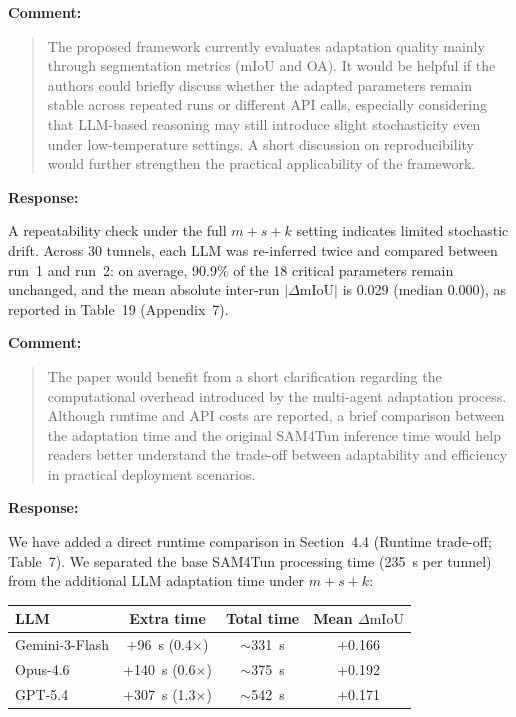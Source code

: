 \documentclass[11pt,a4paper]{article}
\newcommand{\MSRuntimeTable}{Table~7}
\newcommand{\MSAppendixRepeatability}{Appendix~7}
\newenvironment{commentblock}{%
  \par\smallskip\noindent\textbf{Comment:}\par
  \begin{quote}\itshape\color{black}
}{%
  \end{quote}\smallskip
}
\newenvironment{responseblock}{%
  \par\smallskip\noindent\textbf{Response:}\par
  \begingroup\color{responsegreen}
}{%
  \endgroup\smallskip
}
\begin{document}
\begin{commentblock}
The proposed framework currently evaluates adaptation quality mainly through segmentation metrics (mIoU and OA). It would be helpful if the authors could briefly discuss whether the adapted parameters remain stable across repeated runs or different API calls, especially considering that LLM-based reasoning may still introduce slight stochasticity even under low-temperature settings. A short discussion on reproducibility would further strengthen the practical applicability of the framework.
\end{commentblock}
\begin{responseblock}
A repeatability check under the full $m+s+k$ setting indicates limited stochastic drift. Across 30 tunnels, each LLM was re-inferred twice and compared between run~1 and run~2: on average, 90.9\% of the 18 critical parameters remain unchanged, and the mean absolute inter-run $|\Delta\text{mIoU}|$ is 0.029 (median 0.000), as reported in Table~19 (\MSAppendixRepeatability).
\end{responseblock}

\begin{commentblock}
The paper would benefit from a short clarification regarding the computational overhead introduced by the multi-agent adaptation process. Although runtime and API costs are reported, a brief comparison between the adaptation time and the original SAM4Tun inference time would help readers better understand the trade-off between adaptability and efficiency in practical deployment scenarios.
\end{commentblock}
\begin{responseblock}
We have added a direct runtime comparison in Section~4.4 (Runtime trade-off; \MSRuntimeTable). We separated the base SAM4Tun processing time (235~s per tunnel) from the additional LLM adaptation time under $m+s+k$:

{%
\begin{table}[H]
  \centering
  \small
  \color{responsegreen}
  \label{tab:runtime-tradeoff}
  \begin{tabular}{@{}lccc@{}}
    \toprule
    LLM & Extra time & Total time & Mean $\Delta\text{mIoU}$ \\
    \midrule
    Gemini-3-Flash & +96~s (0.4$\times$)  & $\sim$331~s & +0.166 \\
    Opus-4.6       & +140~s (0.6$\times$) & $\sim$375~s & +0.192 \\
    GPT-5.4        & +307~s (1.3$\times$) & $\sim$542~s & +0.171 \\
    \bottomrule
  \end{tabular}
\end{table}
}%
\end{responseblock}
\end{document}
